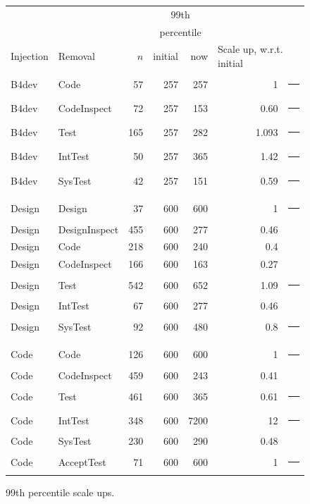 \documentclass[smallcondesed]{svjour3}
\def\baselinestretch{1}
\begin{document}
\begin{figure}[!t]
\renewcommand{\baselinestretch}{0.7}
\scriptsize
\begin{center}
\begin{tabular}{l@{~~}|l@{~}|r@{~}|r@{~}r@{~}|rl}
          \multicolumn{2}{c}{~}                 &  &\multicolumn{2}{c|}{99th }\\
           \multicolumn{2}{c}{~}                 &  &\multicolumn{2}{c|}{percentile }\\
 Injection&   Removal& $n$ & initial & now & \multicolumn{2}{l}{Scale up, w.r.t. initial}
\\\hline

B4dev&Code&57&257&257&1&\rule{2mm}{2mm} \\
B4dev&CodeInspect&72&257&153&0.60&\rule{2mm}{2mm} \\
B4dev&Test&165&257&282&1.093&\rule{2mm}{2mm} \\
B4dev&IntTest&50&257&365&1.42&\rule{2mm}{2mm} \\
B4dev&SysTest&42&257&151&0.59&\rule{2mm}{2mm} \\

\\\hline

Design&Design&37&600&600&1&\rule{2mm}{2mm} \\
Design&DesignInspect&455&600&277&0.46&\rule{0mm}{2mm} \\
Design&Code&218&600&240&0.4&\rule{0mm}{2mm} \\
Design&CodeInspect&166&600&163&0.27&\rule{0mm}{2mm} \\
Design&Test&542&600&652&1.09&\rule{2mm}{2mm} \\
Design&IntTest&67&600&277&0.46&\rule{0mm}{2mm} \\
Design&SysTest&92&600&480&0.8&\rule{2mm}{2mm} \\

\\\hline

Code&Code&126&600&600&1&\rule{2mm}{2mm} \\
Code&CodeInspect&459&600&243&0.41&\rule{0mm}{2mm} \\
Code&Test&461&600&365&0.61&\rule{2mm}{2mm} \\
Code&IntTest&348&600&7200&12&\rule{24mm}{2mm} \\
Code&SysTest&230&600&290&0.48&\rule{0mm}{2mm} \\
Code&AcceptTest&71&600&600&1&\rule{2mm}{2mm} \\
\end{tabular}
\end{center}
\caption{99th percentile scale ups.}
\label{fig:scale99}
\end{figure}
\end{document}
